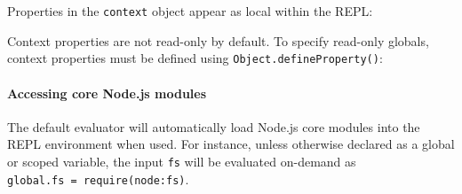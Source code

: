Properties in the \texttt{context} object appear as local within the
REPL:

\begin{Shaded}
\begin{Highlighting}[]
\end{Highlighting}
\end{Shaded}

Context properties are not read-only by default. To specify read-only
globals, context properties must be defined using
\texttt{Object.defineProperty()}:

\begin{Shaded}
\begin{Highlighting}[]
\OperatorTok{=} \NormalTok{(}\NormalTok{)}\OperatorTok{;}
\OperatorTok{=} \OperatorTok{;}

\OperatorTok{=}\NormalTok{(}\StringTok{\textquotesingle{}\textgreater{} \textquotesingle{}}\NormalTok{)}\OperatorTok{;}
\OperatorTok{,} \OperatorTok{,}\NormalTok{ \{}
  \OperatorTok{:} \OperatorTok{,}
  \OperatorTok{:} \OperatorTok{,}
  \OperatorTok{:}\OperatorTok{,}
\NormalTok{\})}\OperatorTok{;}
\end{Highlighting}
\end{Shaded}

\paragraph{Accessing core Node.js
modules}\label{accessing-core-node.js-modules}

The default evaluator will automatically load Node.js core modules into
the REPL environment when used. For instance, unless otherwise declared
as a global or scoped variable, the input \texttt{fs} will be evaluated
on-demand as
\texttt{global.fs\ =\ require(\textquotesingle{}node:fs\textquotesingle{})}.

